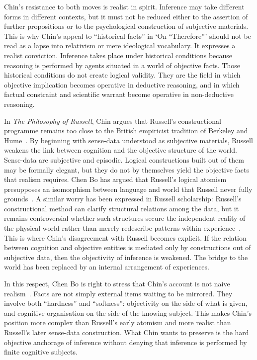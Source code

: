 \documentclass{birkjour}
\begin{document}
Chin's resistance to both moves is realist in spirit. Inference may take different forms in different contexts, but it must not be reduced either to the assertion of further propositions or to the psychological construction of subjective materials. This is why Chin's appeal to ``historical facts'' in `On ``Therefore''' should not be read as a lapse into relativism or mere ideological vocabulary. It expresses a realist conviction. Inference takes place under historical conditions because reasoning is performed by agents situated in a world of objective facts. Those historical conditions do not create logical validity. They are the field in which objective implication becomes operative in deductive reasoning, and in which factual constraint and scientific warrant become operative in non-deductive reasoning.

In \textit{The Philosophy of Russell}, Chin argues that Russell's constructional programme remains too close to the British empiricist tradition of Berkeley and Hume~\cite{Jin1988}. By beginning with sense-data understood as subjective materials, Russell weakens the link between cognition and the objective structure of the world. Sense-data are subjective and episodic. Logical constructions built out of them may be formally elegant, but they do not by themselves yield the objective facts that realism requires. Chen Bo has argued that Russell's logical atomism presupposes an isomorphism between language and world that Russell never fully grounds~\cite[pp.~944--945]{ChenB2019b}. A similar worry has been expressed in Russell scholarship: Russell's constructional method can clarify structural relations among the data, but it remains controversial whether such structures secure the independent reality of the physical world rather than merely redescribe patterns within experience~\cite{DemopoulosFriedman1985,LinskyLogicalConstruction}. This is where Chin's disagreement with Russell becomes explicit. If the relation between cognition and objective entities is mediated only by constructions out of subjective data, then the objectivity of inference is weakened. The bridge to the world has been replaced by an internal arrangement of experiences.

In this respect, Chen Bo is right to stress that Chin's account is not naive realism~\cite[pp.~937--944]{ChenB2019b}. Facts are not simply external items waiting to be mirrored. They involve both ``hardness'' and ``softness'': objectivity on the side of what is given, and cognitive organisation on the side of the knowing subject. This makes Chin's position more complex than Russell's early atomism and more realist than Russell's later sense-data construction. What Chin wants to preserve is the hard objective anchorage of inference without denying that inference is performed by finite cognitive subjects.
\end{document}
